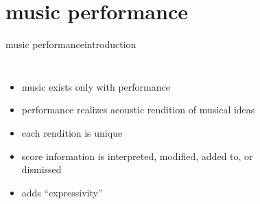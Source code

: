     \section{music performance}
        \begin{frame}{music performance}{introduction}
            \vspace{-5mm}
            \begin{columns}
            \begin{itemize}
                \item	music exists only with performance
                \item   performance realizes acoustic rendition of musical ideas 
                \item   each rendition is unique
                \item   score information is interpreted, modified, added to, or dismissed
                \item   adds “expressivity”
            \end{itemize}
            
                \begin{figure}
                   \scalebox{.5}{	}
                \end{figure}
            \end{columns}
            
            \bigskip
            \hspace{5mm}  

            \vspace{-30mm}
        \end{frame}
